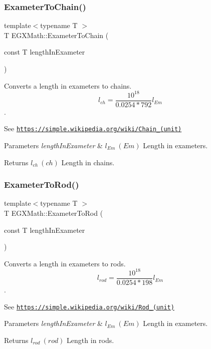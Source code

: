 \subsubsection{\texorpdfstring{Exameter\+To\+Chain()}{ExameterToChain()}}
{\footnotesize\ttfamily template$<$typename T $>$ \\
T E\+G\+X\+Math\+::\+Exameter\+To\+Chain (\begin{DoxyParamCaption}\item[{const T}]{length\+In\+Exameter }\end{DoxyParamCaption})}



Converts a length in exameters to chains. \[ l_{ch}= \frac{10^{18}}{0.0254 * 792} l_{Em} \]. 

See \href{https://simple.wikipedia.org/wiki/Chain_(unit)}{\tt https\+://simple.\+wikipedia.\+org/wiki/\+Chain\+\_\+(unit)} 
\begin{DoxyParams}{Parameters}
{\em length\+In\+Exameter} & $ l_{Em}\ (Em)$ Length in exameters. \\
\hline
\end{DoxyParams}
\begin{DoxyReturn}{Returns}
$ l_{ch}\ (ch)$ Length in chains. 
\end{DoxyReturn}
\mbox{\label{group___e_g_x_math-_conversions-_length_conversions-_exameter-_surveyors_ga5d842e19237d7aecc7d5c2428e4ac434}} 
\subsubsection{\texorpdfstring{Exameter\+To\+Rod()}{ExameterToRod()}}
{\footnotesize\ttfamily template$<$typename T $>$ \\
T E\+G\+X\+Math\+::\+Exameter\+To\+Rod (\begin{DoxyParamCaption}\item[{const T}]{length\+In\+Exameter }\end{DoxyParamCaption})}



Converts a length in exameters to rods. \[ l_{rod}= \frac{10^{18}}{0.0254 * 198} l_{Em} \]. 

See \href{https://simple.wikipedia.org/wiki/Rod_(unit)}{\tt https\+://simple.\+wikipedia.\+org/wiki/\+Rod\+\_\+(unit)} 
\begin{DoxyParams}{Parameters}
{\em length\+In\+Exameter} & $ l_{Em}\ (Em)$ Length in exameters. \\
\hline
\end{DoxyParams}
\begin{DoxyReturn}{Returns}
$ l_{rod}\ (rod)$ Length in rods. 
\end{DoxyReturn}
